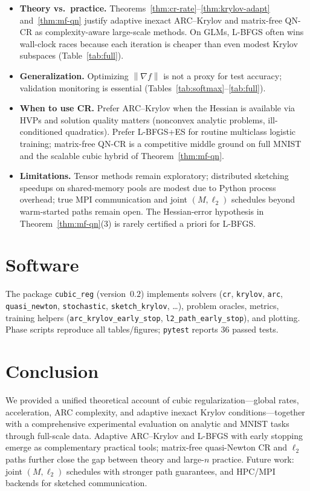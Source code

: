 \documentclass[11pt,a4paper]{article}
\newcommand{\norm}[1]{\left\|#1\right\|}
\newcommand{\grad}{\nabla}
\begin{document}
\begin{itemize}[leftmargin=*]
  \item \textbf{Theory vs.\ practice.} Theorems~\ref{thm:cr-rate}--\ref{thm:krylov-adapt} and~\ref{thm:mf-qn} justify adaptive inexact ARC--Krylov and matrix-free QN-CR as complexity-aware large-scale methods. On GLMs, L-BFGS often wins wall-clock races because each iteration is cheaper than even modest Krylov subspaces (Table~\ref{tab:full}).
  \item \textbf{Generalization.} Optimizing $\norm{\grad f}$ is not a proxy for test accuracy; validation monitoring is essential (Tables~\ref{tab:softmax}--\ref{tab:full}).
  \item \textbf{When to use CR.} Prefer ARC--Krylov when the Hessian is available via HVPs and solution quality matters (nonconvex analytic problems, ill-conditioned quadratics). Prefer L-BFGS+ES for routine multiclass logistic training; matrix-free QN-CR is a competitive middle ground on full MNIST and the scalable cubic hybrid of Theorem~\ref{thm:mf-qn}.
  \item \textbf{Limitations.} Tensor methods remain exploratory; distributed sketching speedups on shared-memory pools are modest due to Python process overhead; true MPI communication and joint $(M,\ell_{2})$ schedules beyond warm-started paths remain open. The Hessian-error hypothesis in Theorem~\ref{thm:mf-qn}(3) is rarely certified a priori for L-BFGS.
\end{itemize}

\section{Software}
\label{sec:soft}
The package \texttt{cubic\_reg} (version~$0.2$) implements solvers (\texttt{cr}, \texttt{krylov}, \texttt{arc}, \texttt{quasi\_newton}, \texttt{stochastic}, \texttt{sketch\_krylov}, \ldots), problem oracles, metrics, training helpers (\texttt{arc\_krylov\_early\_stop}, \texttt{l2\_path\_early\_stop}), and plotting.
Phase scripts reproduce all tables/figures; \texttt{pytest} reports $36$ passed tests.

\section{Conclusion}
\label{sec:conc}
We provided a unified theoretical account of cubic regularization---global rates, acceleration, ARC complexity, and adaptive inexact Krylov conditions---together with a comprehensive experimental evaluation on analytic and MNIST tasks through full-scale data.
Adaptive ARC--Krylov and L-BFGS with early stopping emerge as complementary practical tools; matrix-free quasi-Newton CR and $\ell_{2}$ paths further close the gap between theory and large-$n$ practice.
Future work: joint $(M,\ell_{2})$ schedules with stronger path guarantees, and HPC/MPI backends for sketched communication.
\end{document}
